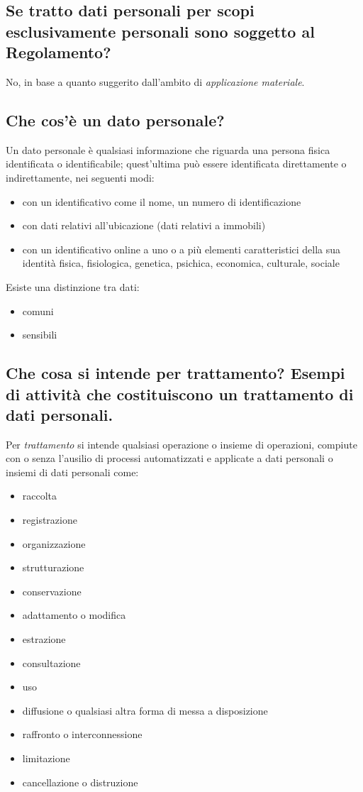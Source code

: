 \subsection{Se tratto dati personali per scopi esclusivamente personali sono
soggetto al Regolamento?}
No, in base a quanto suggerito dall'ambito di \textit{applicazione materiale}.


\subsection{Che cos’è un dato personale?}
Un dato personale è qualsiasi informazione che riguarda una persona fisica identificata o identificabile;
quest'ultima può essere identificata direttamente o indirettamente, nei seguenti modi:
\begin{itemize}
    \item con un identificativo come il nome, un numero di identificazione
    \item con dati relativi all'ubicazione (dati relativi a immobili)
    \item con un identificativo online a uno o a più elementi caratteristici
        della sua identità fisica, fisiologica, genetica, psichica, economica,
        culturale, sociale
\end{itemize}
Esiste una distinzione tra dati:
\begin{itemize}
    \item comuni
    \item sensibili
\end{itemize}

\subsection{Che cosa si intende per trattamento? Esempi di attività che costituiscono un trattamento di
dati personali.}
Per \textit{trattamento} si intende qualsiasi operazione o insieme di
operazioni, compiute con o senza l'ausilio di processi automatizzati e
applicate a dati personali o insiemi di dati personali come:
\begin{itemize}
    \item raccolta
    \item registrazione
    \item organizzazione
    \item strutturazione
    \item conservazione
    \item adattamento o modifica
    \item estrazione
    \item consultazione
    \item uso
    \item diffusione o qualsiasi altra forma di messa a disposizione
    \item raffronto o interconnessione
    \item limitazione
    \item cancellazione o distruzione
\end{itemize}

